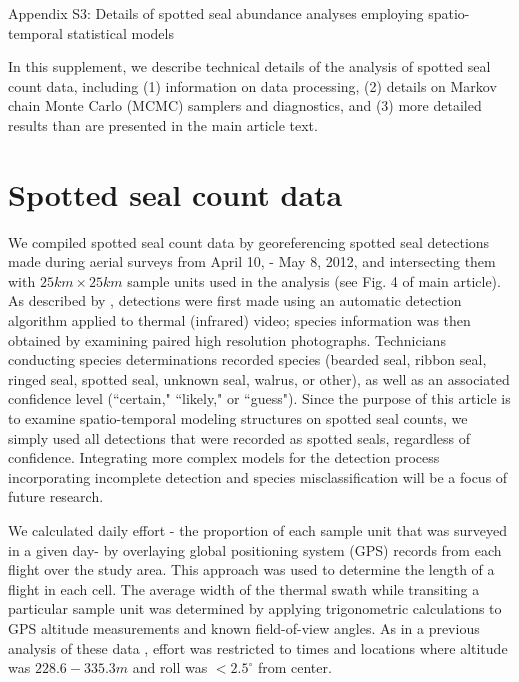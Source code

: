 \documentclass[12pt,fleqn]{article}
\begin{document}
\rm \begin{flushleft}

\raggedbottom
\vspace{.5in}


\begin{center}
Appendix S3: Details of spotted seal abundance analyses employing spatio-temporal statistical models 
\bigskip
\end{center}

\doublespacing
In this supplement, we describe technical details of the analysis of spotted seal count data, including (1) information on data processing, (2) details on Markov chain Monte Carlo (MCMC) samplers and diagnostics, and (3) more detailed results than are presented in the main article text.

\section{Spotted seal count data}

We compiled spotted seal count data by georeferencing spotted seal detections made during aerial surveys from April 10, - May 8, 2012, and intersecting them with $25km \times 25km$ sample units used in the analysis (see Fig. 4 of main article).  As described by \citet{ConnEtAl2014}, detections were first made using an automatic detection algorithm applied to thermal (infrared) video; species information was then obtained by examining paired high resolution photographs.  Technicians conducting species determinations recorded species (bearded seal, ribbon seal, ringed seal, spotted seal, unknown seal, walrus, or other), as well as an associated confidence level (``certain," ``likely," or ``guess").  Since the purpose of this article is to examine spatio-temporal modeling structures on spotted seal counts, we simply used all detections that were recorded as spotted seals, regardless of confidence.  Integrating more complex models for the detection process incorporating incomplete detection and species misclassification \citep[see e.g.][]{ConnEtAl2014} will be a focus of future research.

\hspace{.5in} We calculated daily effort - the proportion of each sample unit that was surveyed in a given day- by overlaying global positioning system (GPS) records from each flight over the study area.  This approach was used to determine the length of a flight in each cell.  The average width of the thermal swath while transiting a particular sample unit was determined by applying trigonometric calculations to GPS altitude measurements and known field-of-view angles.  As in a previous analysis of these data \citep{ConnEtAl2014}, effort was restricted to times and locations where altitude was $228.6-335.3m$ and roll was $<2.5^\circ$ from center.


\end{flushleft}
\end{document}

